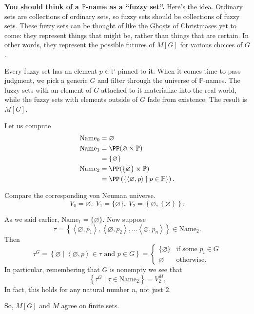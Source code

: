 \documentclass[11pt]{scrreprt}
\newcommand{\Name}{\text{Name}}
\newcommand{\Po}{\mathbb P}
\begin{document}
\textbf{You should think of a $\Po$-name as a ``fuzzy set''.}
Here's the idea.
Ordinary sets are collections of ordinary sets,
so fuzzy sets should be collections of fuzzy sets.
These fuzzy sets can be thought of like the Ghosts of Christmases yet to come:
they represent things that might be, rather than things that are certain.
In other words, they represent the possible futures of $M[G]$ for various choices of $G$.

Every fuzzy set has an element $p \in \Po$ pinned to it.
When it comes time to pass judgment,
we pick a generic $G$ and filter through the universe of $\Po$-names.
The fuzzy sets with an element of $G$ attached to it materialize into the real world,
while the fuzzy sets with elements outside of $G$ fade from existence.
The result is $M[G]$.

\begin{example}
	Let us compute
	\begin{align*}
		\Name_0 &= \varnothing \\
		\Name_1 &= \PP(\varnothing \times \Po) \\
		&= \{\varnothing\} \\
		\Name_2 &= \PP(\{\varnothing\} \times \Po) \\
		&= \PP\left( \left\{ 
			\left<\varnothing, p\right>
			\mid p \in \Po
		\right\} \right).
	\end{align*}
\end{example}
Compare the corresponding von Neuman universe.
\[ V_0 = \varnothing, \; V_1 = \{\varnothing\}, \;
V_2 = \left\{ \varnothing, \left\{ \varnothing \right\} \right\}. \]

\begin{example}
	As we said earlier, $\Name_1 = \{\varnothing\}$.
	Now suppose
	\[ \tau =
		\left\{
			\left<\varnothing, p_1\right>,
			\left<\varnothing, p_2\right>,
			\dots
			\left<\varnothing, p_n\right>
		\right\} 
		\in \Name_2. \]
	Then 
	\[
		\tau^G
		= \left\{ \varnothing \mid
		\left<\varnothing, p\right> \in \tau \text{ and } p \in G\right\}
		=
		\begin{cases}
			\{\varnothing\} & \text{if some } p_i \in G \\
			\varnothing & \text{otherwise}.
		\end{cases}
	\]
	In particular, remembering that $G$ is nonempty we see that
	\[ \left\{ \tau^G \mid \tau \in \Name_2 \right\} = V_2^M. \]
	In fact, this holds for any natural number $n$, not just $2$.
\end{example}
So, $M[G]$ and $M$ agree on finite sets.
\end{document}
